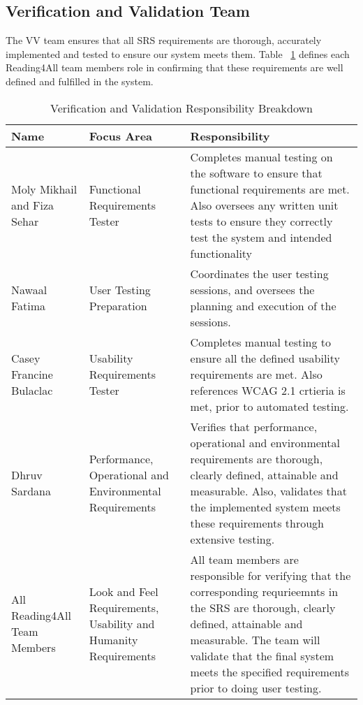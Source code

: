 \documentclass[12pt, titlepage]{article}
\begin{document}
\subsection{Verification and Validation Team}


The V\*V team ensures that all SRS requirements are thorough, accurately implemented and tested to ensure our system meets them. 
Table ~\ref{tab:data-dictionary-reading4all} defines each Reading4All team members role in confirming that these requirements are well defined and fulfilled in the system.

\begin{table}[H]
    \centering
    \caption{Verification and Validation Responsibility Breakdown}
    \label{tab:data-dictionary-reading4all}
    \begin{tabular}{ |p{3.0cm}|p{3.8cm}|p{7.3cm}| }
      \hline
      \textbf{Name} & \textbf{ Focus Area } & \textbf{Responsibility} \\
      \hline
      Moly Mikhail and Fiza Sehar & Functional Requirements Tester & Completes manual testing on the software to ensure that functional requirements are met. Also oversees any written unit tests to ensure they correctly test the system and intended functionality \\
      \hline
      Nawaal Fatima & User Testing Preparation & Coordinates the user testing sessions, and oversees the planning and execution of the sessions. \\
      \hline 
      Casey Francine Bulaclac & Usability Requirements Tester & Completes manual testing to ensure all the defined usability requirements are met. Also references WCAG 2.1 crtieria is met, prior to automated testing. \\
      \hline 
      Dhruv Sardana & Performance, Operational and Environmental Requirements & Verifies that performance, operational and environmental requirements are thorough, clearly defined, attainable and measurable. Also, validates that the implemented system meets these requirements through extensive testing.  \\
      \hline 
      All Reading4All Team Members & Look and Feel Requirements, Usability and Humanity Requirements & All team members are responsible for verifying that the corresponding requrieemnts in the SRS are thorough, clearly defined, attainable and measurable. The team will validate that the final system meets the specified requirements prior to doing user testing. \\

\end{tabular}
\end{table}
\end{document}
